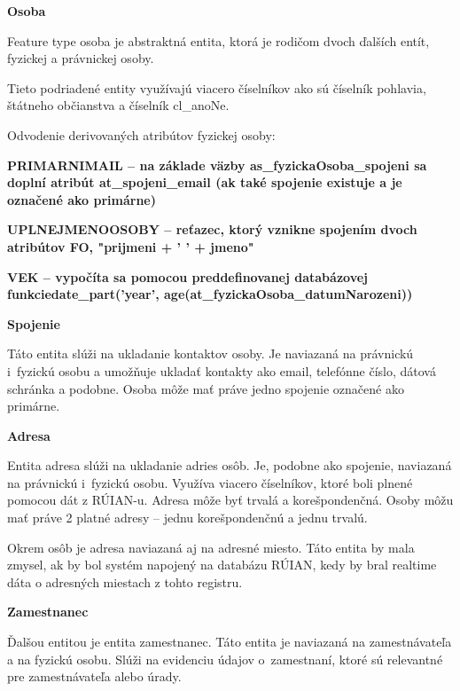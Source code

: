 \blank
\start
\setupindenting[no]
\start\bf Osoba \stop
\stop

Feature type osoba je abstraktná entita, ktorá je rodičom dvoch ďalších entít, fyzickej a právnickej osoby. 

Tieto podriadené entity využívajú viacero číselníkov ako sú číselník pohlavia, štátneho občianstva a číselník cl_anoNe.

\blank
Odvodenie derivovaných atribútov fyzickej osoby: %



\startitemize
\item {\start\bf PRIMARNIMAIL \stop -- na základe väzby as_fyzickaOsoba_spojeni sa doplní atribút at_spojeni_email (ak také spojenie existuje a je označené ako primárne)}
\item {\start\bf UPLNEJMENOOSOBY \stop -- reťazec, ktorý vznikne spojením dvoch atribútov FO, "prijmeni + ' ' + jmeno"}
\item {\start\bf VEK \stop -- vypočíta sa pomocou preddefinovanej databázovej funkcie\zlom date_part('year', age(at_fyzickaOsoba_datumNarozeni)) }
\stopitemize

\blank
\start
\setupindenting[no]
\start\bf Spojenie \stop
\stop

Táto entita slúži na ukladanie kontaktov osoby. Je naviazaná na právnickú i~fyzickú osobu a umožňuje ukladať kontakty ako email, telefónne číslo, dátová schránka a podobne. Osoba môže mať práve jedno spojenie označené ako primárne.

\blank
\start
\setupindenting[no]
\start\bf Adresa \stop
\stop

Entita adresa slúži na ukladanie adries osôb. Je, podobne ako spojenie, naviazaná na právnickú i~fyzickú osobu. Využíva viacero číselníkov, ktoré boli plnené pomocou dát z RÚIAN-u. Adresa môže byť trvalá a korešpondenčná. Osoby môžu mať práve 2 platné adresy -- jednu korešpondenčnú a jednu trvalú.

Okrem osôb je adresa naviazaná aj na adresné miesto. Táto entita by mala zmysel, ak by bol systém napojený na databázu RÚIAN, kedy by bral realtime dáta o adresných miestach z tohto registru.

\blank
\start
\setupindenting[no]
\start\bf Zamestnanec \stop
\stop

Ďalšou entitou je entita zamestnanec. Táto entita je naviazaná na zamestnávateľa a na fyzickú osobu. Slúži na evidenciu údajov o~zamestnaní, ktoré sú relevantné pre zamestnávateľa alebo úrady.

